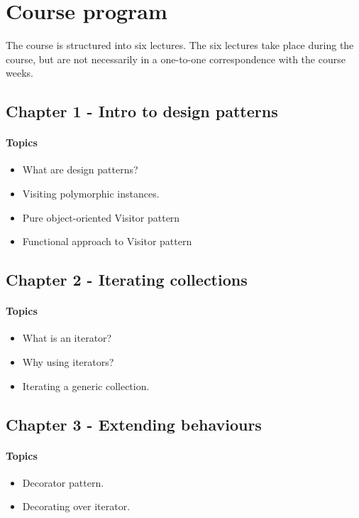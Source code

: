 \section{Course program}
The course is structured into six lectures.
The six lectures take place during the course, but are not necessarily in a one-to-one correspondence with the course weeks.

\subsection{Chapter 1 - Intro to design patterns} 
\paragraph*{Topics}
\begin{itemize}
	\item What are design patterns? 
	\item Visiting polymorphic instances. 
	\item Pure object-oriented Visitor pattern 
	\item Functional approach to Visitor pattern 
\end{itemize}

\subsection{Chapter 2 - Iterating collections}
\paragraph*{Topics}			
\begin{itemize}
	\item What is an iterator? 
	\item Why using iterators? 
	\item Iterating a generic collection. 
\end{itemize}

\subsection{Chapter 3 - Extending behaviours}
\paragraph*{Topics}			
\begin{itemize}
	\item Decorator pattern. 
	\item Decorating over iterator. 
\end{itemize}


